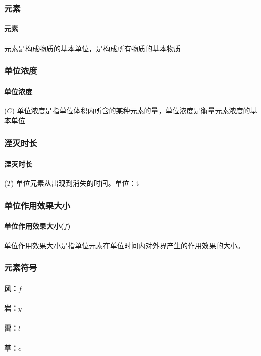 \documentclass[12pt,a4paper]{article}%
\begin{document}
	\subsubsection{元素}
	\paragraph{元素}  元素是构成物质的基本单位，是构成所有物质的基本物质
	\subsubsection{单位浓度}
	\paragraph{单位浓度}($C$)  单位浓度是指单位体积内所含的某种元素的量，单位浓度是衡量元素浓度的基本单位
	\subsubsection{湮灭时长}
	\paragraph{湮灭时长}($T$) 单位元素从出现到消失的时间。单位：t

	\subsubsection{单位作用效果大小}
	\paragraph{单位作用效果大小($f$)} 单位作用效果大小是指单位元素在单位时间内对外界产生的作用效果的大小。

	
	\subsubsection{元素符号}
	\paragraph{风：$f$}
	\paragraph{岩：$y$}
	\paragraph{雷：$l$}
	\paragraph{草：$c$}
\end{document}
